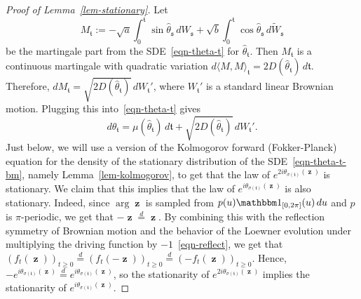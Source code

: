 \documentclass[11pt]{article}
\theoremstyle{plain}
\theoremstyle{definition}
\numberwithin{equation}{section}
\newcommand{\eqb}{\begin{equation}}
\newcommand{\eqe}{\end{equation}}
\newcommand{\eqbn}{\begin{equation*}}
\newcommand{\eqen}{\end{equation*}}
\newcommand{\BB}{\mathbbm}
\newcommand{\op}{\operatorname}
\newcommand{\la}{\langle}
\newcommand{\ra}{\rangle}
\newcommand{\eqD}{\overset{d}{=}}
\newcommand{\wt}{\widetilde}
\newcommand{\wh}{\widehat}
\newcommand{\zz}{{\op{\mathbf{z}}}}
\newcommand{\tz}{{\mathfrak t}}
\newcommand{\sz}{{\mathfrak s}}
\begin{document}
\begin{proof}[Proof of Lemma~\ref{lem-stationary}]
Let
\eqbn
M_\tz := - \sqrt{a} \int_0^\tz \sin{\wh\theta_\sz}  \, dW_\sz + \sqrt{b} \int_0^\tz \cos{\wh\theta_\sz}  \, d\wt W_\sz 
\eqen
be the martingale part from the SDE~\eqref{eqn-theta-t} for $\wh\theta_\tz$. 
Then $M_\tz$ is a continuous martingale with quadratic variation $d\la M , M \ra_\tz = 2 D(\wh\theta_\tz) \,d\tz$.
Therefore, $dM_\tz = \sqrt{2 D(\wh\theta_\tz)} \,dW_\tz'$, where $W_\tz'$ is a standard linear Brownian motion. 
Plugging this into~\eqref{eqn-theta-t} gives
\eqb \label{eqn-theta-t-bm}
d\wh\theta_\tz = \mu(\wh\theta_\tz) \, d\tz  + \sqrt{2 D(\wh\theta_\tz)} \,dW_\tz' .
\eqe
Just below, we will use a version of the Kolmogorov forward (Fokker-Planck) equation for the density of the stationary distribution of the SDE~\eqref{eqn-theta-t-bm}, namely Lemma~\ref{lem-kolmogorov}, to get that the law of $e^{2i \theta_{\sigma(\tz)}(\zz)}$ is stationary. We claim that this implies that the law of $e^{ i \theta_{\sigma(\tz)}(\zz)}$ is also stationary. Indeed, since $\arg \zz$ is sampled from $p(u) \BB 1_{[0,2\pi]}(u) \,du$ and $p$ is $\pi$-periodic, we get that $-\zz \eqD \zz$. By combining this with the reflection symmetry of Brownian motion and the behavior of the Loewner evolution under multiplying the driving function by $-1$~\eqref{eqn-reflect}, we get that $(f_t(\zz))_{t\geq 0} \eqD (f_t(-\zz))_{t\geq 0}\eqD (-f_t( \zz))_{t\geq 0}$. Hence, $-e^{i \theta_{\sigma(\tz)}(\zz)} \eqD e^{i \theta_{\sigma(\tz)}(\zz)} $, so the stationarity of $e^{2i \theta_{\sigma(\tz)}(\zz)}$ implies the stationarity of $e^{ i \theta_{\sigma(\tz)}(\zz)}$. 


\end{proof}
\end{document}
